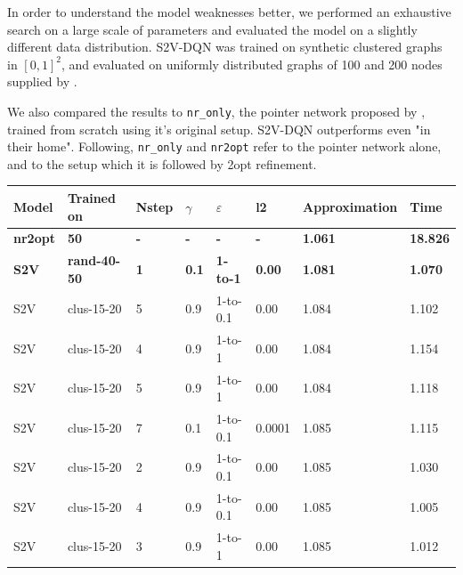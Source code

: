 \documentclass[10pt,a4paper,draft]{article}
\begin{document}
In order to understand the model weaknesses better, we performed an exhaustive search on a large scale of parameters and evaluated the model on a slightly different data distribution. S2V-DQN was trained on synthetic clustered graphs in $[0,1]^2$, and evaluated on uniformly distributed graphs of 100 and 200 nodes supplied by \cite{deudon18-tsp-nr2opt}.

We also compared the results to \texttt{nr\_only}, the pointer network proposed by \cite{deudon18-tsp-nr2opt}, trained from scratch using it's original setup. S2V-DQN outperforms \cite{deudon18-tsp-nr2opt} even "in their home". Following,  \texttt{nr\_only} and \texttt{nr2opt} refer to the pointer network alone, and to the setup which it is followed by 2opt refinement.

\begin{table}[]
\centering
\begin{tabular}{@{}llllllll@{}}
\toprule
Model           & Trained on          & Nstep      & $\gamma$     & $\varepsilon$   & l2            & Approximation  & Time            \\ \midrule
\textbf{nr2opt} & \textbf{50}         & \textbf{-} & \textbf{-}   & \textbf{-}      & \textbf{-}    & \textbf{1.061} & \textbf{18.826} \\
\textbf{S2V}    & \textbf{rand-40-50} & \textbf{1} & \textbf{0.1} & \textbf{1-to-1} & \textbf{0.00} & \textbf{1.081} & \textbf{1.070}  \\
S2V             & clus-15-20          & 5          & 0.9          & 1-to-0.1        & 0.00          & 1.084          & 1.102           \\
S2V             & clus-15-20          & 4          & 0.9          & 1-to-1          & 0.00          & 1.084          & 1.154           \\
S2V             & clus-15-20          & 5          & 0.9          & 1-to-1          & 0.00          & 1.084          & 1.118           \\
S2V             & clus-15-20          & 7          & 0.1          & 1-to-0.1        & 0.0001        & 1.085          & 1.115           \\
S2V             & clus-15-20          & 2          & 0.9          & 1-to-0.1        & 0.00          & 1.085          & 1.030           \\
S2V             & clus-15-20          & 4          & 0.9          & 1-to-0.1        & 0.00          & 1.085          & 1.005           \\
S2V             & clus-15-20          & 3          & 0.9          & 1-to-1          & 0.00          & 1.085          & 1.012           \\

\end{tabular}
\end{table}
\end{document}
